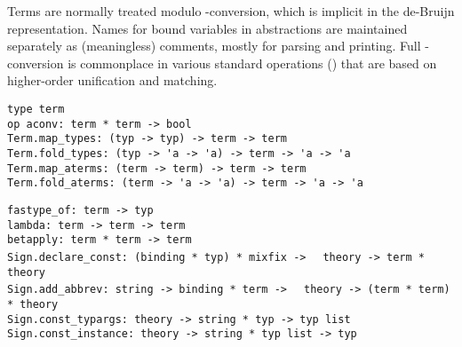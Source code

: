 \begin{isabellebody}
\begin{isamarkuptext}
  Terms are normally treated modulo \isa{{\isasymalpha}}-conversion, which is
  implicit in the de-Bruijn representation.  Names for bound variables
  in abstractions are maintained separately as (meaningless) comments,
  mostly for parsing and printing.  Full \isa{{\isasymalpha}{\isasymbeta}{\isasymeta}}-conversion is
  commonplace in various standard operations ()
  that are based on higher-order unification and matching.%
\end{isamarkuptext}%
\isamarkuptrue%
%
\isadelimmlref
%
\endisadelimmlref
%
\isatagmlref
%
\begin{isamarkuptext}%
\begin{mldecls}
  \verb|type term| \\
  \verb|op aconv: term * term -> bool| \\
  \verb|Term.map_types: (typ -> typ) -> term -> term| \\
  \verb|Term.fold_types: (typ -> 'a -> 'a) -> term -> 'a -> 'a| \\
  \verb|Term.map_aterms: (term -> term) -> term -> term| \\
  \verb|Term.fold_aterms: (term -> 'a -> 'a) -> term -> 'a -> 'a| \\
  \end{mldecls}
  \begin{mldecls}
  \verb|fastype_of: term -> typ| \\
  \verb|lambda: term -> term -> term| \\
  \verb|betapply: term * term -> term| \\
  \verb|Sign.declare_const: (binding * typ) * mixfix ->|\isasep\isanewline%
\verb|  theory -> term * theory| \\
  \verb|Sign.add_abbrev: string -> binding * term ->|\isasep\isanewline%
\verb|  theory -> (term * term) * theory| \\
  \verb|Sign.const_typargs: theory -> string * typ -> typ list| \\
  \verb|Sign.const_instance: theory -> string * typ list -> typ| \\
  \end{mldecls}


\end{isamarkuptext}
\end{isabellebody}

